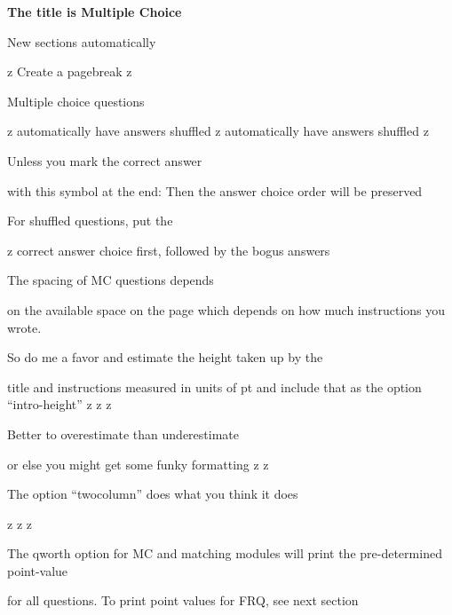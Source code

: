 \documentclass{exam}
\begin{document}
\newpage
\par\noindent \textbf{\large  The title is Multiple Choice}
\setlength{\columnsep}{0.40 in}
\begin{multicols*}{2}
\renewcommand{\choiceshook}{\setlength{\leftmargin}{0.40 in}}
\renewcommand{\questionshook}{\setlength{\leftmargin}{0.0 in}}
\begin{questions}
\setcounter{question}{19}
	\question[2] New sections automatically
	\begin{choices}
		\choice z
		\CorrectChoice Create a pagebreak
		\choice z
	\end{choices}
	\question[2] Multiple choice questions
	\begin{choices}
		\choice z
		\CorrectChoice automatically have answers shuffled
		\choice z
		\CorrectChoice automatically have answers shuffled
		\choice z
	\end{choices}
	\question[2] Unless you mark the correct answer
	\begin{choices}
		\CorrectChoice with this symbol at the end:
		\choice Then the answer choice order
		\choice will be
		\choice preserved
	\end{choices}
	\question[2] For shuffled questions, put the
	\begin{choices}
		\choice z
		\CorrectChoice correct answer choice first,
		\choice followed by the bogus answers
	\end{choices}
	\question[2] The spacing of MC questions depends
	\begin{choices}
		\choice on the available space on the page
		\CorrectChoice which depends on how much instructions you wrote.
	\end{choices}
	\question[2] So do me a favor and estimate the height taken up by the
	\begin{choices}
		\choice title and instructions
		\CorrectChoice measured in units of pt
		\choice and include that as the option ``intro-height''
		\choice z
		\choice z
		\choice z
	\end{choices}
	\question[2] Better to overestimate than underestimate
	\begin{choices}
		\CorrectChoice or else you might get some funky formatting
		\choice z
		\choice z
	\end{choices}
	\vfill\null\columnbreak
	\question[2] The option ``twocolumn'' does what you think it does
	\begin{choices}
		\CorrectChoice z
		\CorrectChoice z
		\CorrectChoice z
	\end{choices}
	\question[2] The qworth option for MC and matching modules will print the pre-determined point-value
	\begin{choices}
		\CorrectChoice for all questions.
		\choice To print point values for FRQ, see next section
	\end{choices}
\end{questions}
\end{multicols*}
\renewcommand{\choiceshook}{}
\renewcommand{\questionshook}{}
\end{document}
